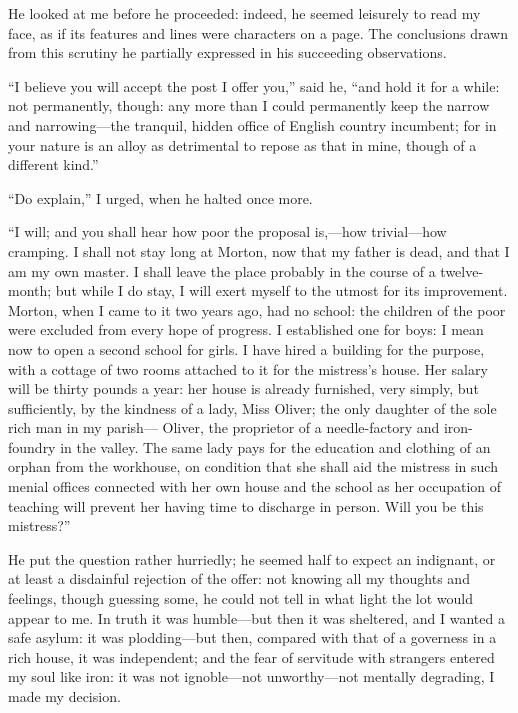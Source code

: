 He looked at me before he proceeded: indeed, he seemed leisurely to read
my face, as if its features and lines were characters on a page. The
conclusions drawn from this scrutiny he partially expressed in his
succeeding observations.

\enquote{I believe you will accept the post I offer you,} said he,
\enquote{and hold it for a while: not permanently, though: any more than
	I could permanently keep the narrow and narrowing---the tranquil, hidden
	office of English country incumbent; for in your nature is an alloy as
	detrimental to repose as that in mine, though of a different kind.}

\enquote{Do explain,} I urged, when he halted once more.

\enquote{I will; and you shall hear how poor the proposal is,---how
	trivial---how cramping. I shall not stay long at Morton, now that my
	father is dead, and that I am my own master. I shall leave the place
	probably in the course of a twelve-month; but while I do stay, I will
	exert myself to the utmost for its improvement. Morton, when I came to
	it two years ago, had no school: the children of the poor were excluded
	from every hope of progress. I established one for boys: I mean now to
	open a second school for girls. I have hired a building for the
	purpose, with a cottage of two rooms attached to it for the mistress's
	house. Her salary will be thirty pounds a year: her house is already
	furnished, very simply, but sufficiently, by the kindness of a lady,
	Miss Oliver; the only daughter of the sole rich man in my parish---\Mr{}
	Oliver, the proprietor of a needle-factory and iron-foundry in the
	valley. The same lady pays for the education and clothing of an orphan
	from the workhouse, on condition that she shall aid the mistress in such
	menial offices connected with her own house and the school as her
	occupation of teaching will prevent her having time to discharge in
	person. Will you be this mistress?}

He put the question rather hurriedly; he seemed half to expect an
indignant, or at least a disdainful rejection of the offer: not knowing
all my thoughts and feelings, though guessing some, he could not tell in
what light the lot would appear to me. In truth it was humble---but
then it was sheltered, and I wanted a safe asylum: it was plodding---but
then, compared with that of a governess in a rich house, it was
independent; and the fear of servitude with strangers entered my soul
like iron: it was not ignoble---not unworthy---not mentally degrading, I
made my decision.

